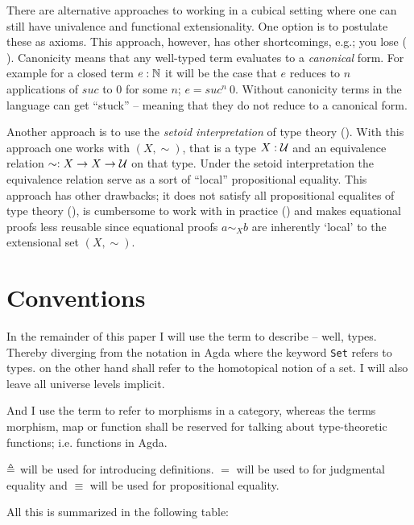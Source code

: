 There are alternative approaches to working in a cubical setting where one can
still have univalence and functional extensionality. One option is to postulate
these as axioms. This approach, however, has other shortcomings, e.g.; you lose
 ( \cite{huber-2016}). Canonicity means that any
well-typed term evaluates to a \emph{canonical} form. For example for a closed
term $e : \mathbb{N}$ it will be the case that $e$ reduces to $n$ applications of
$\mathit{suc}$ to $0$ for some $n$; $e = \mathit{suc}^n\ 0$. Without canonicity
terms in the language can get ``stuck'' -- meaning that they do not reduce to a
canonical form.

Another approach is to use the \emph{setoid interpretation} of type theory
(\cite{hofmann-1995,huber-2016}). With this approach one works with
 $(X, \sim)$, that is a type $X \mathrel{:} \mathcal{U}$ and an
equivalence relation $\sim \mathrel{:} X \to X \to \mathcal{U}$ on that type. Under the setoid
interpretation the equivalence relation serve as a sort of ``local''
propositional equality. This approach has other drawbacks; it does not satisfy
all propositional equalites of type theory (), is
cumbersome to work with in practice (\cite[p. 4]{huber-2016}) and makes
equational proofs less reusable since equational proofs $a \sim_{X} b$ are
inherently `local' to the extensional set $(X , \sim)$.

\section{Conventions}

In the remainder of this paper I will use the term  to describe --
well, types. Thereby diverging from the notation in Agda where the keyword
\texttt{Set} refers to types.  on the other hand shall refer to the
homotopical notion of a set. I will also leave all universe levels implicit.

And I use the term  to refer to morphisms in a category, whereas
the terms morphism, map or function shall be reserved for talking about
type-theoretic functions; i.e. functions in Agda.

$\mathrel{\triangleq}$ will be used for introducing definitions. $=$ will be used to for
judgmental equality and $\equiv$ will be used for propositional equality.

All this is summarized in the following table:

